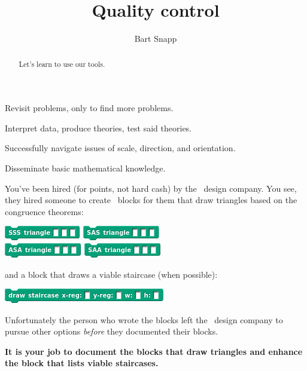 \documentclass[noauthor,nooutcomes,12pt,hints,handout]{ximera}
\title{Quality control}
\author{Bart Snapp}
\begin{document}
\begin{abstract}
  Let's learn to use our tools.
\end{abstract}
\maketitle

\begin{listOutcomes}
\item Revisit problems, only to find more problems.
\item Interpret data, produce theories, test said theories.
\item Successfully navigate issues of scale, direction, and
  orientation.
\item Disseminate basic mathematical knowledge.
\end{listOutcomes}

You've been hired (for points, not hard cash) by the \mooculus\ design
company. You see, they hired someone to create \snap\ blocks for them
that draw triangles based on the congruence theorems:
\begin{center}
  \includegraphics{SSSblank.png} \qquad \includegraphics{SASblank.png} \\[5mm]
  \includegraphics{ASAblank.png} \qquad \includegraphics{SAAblank.png}
\end{center}
and a block that draws a viable staircase (when possible):
\begin{center}
  \includegraphics{drawStaircaseBlockBlank.png}
\end{center}
    

Unfortunately the person who wrote the blocks left the
\mooculus\ design company to pursue other options \textit{before} they
documented their blocks.

\textbf{It is your job to document the blocks that draw triangles and enhance
  the block that lists viable staircases.}
\end{document}
